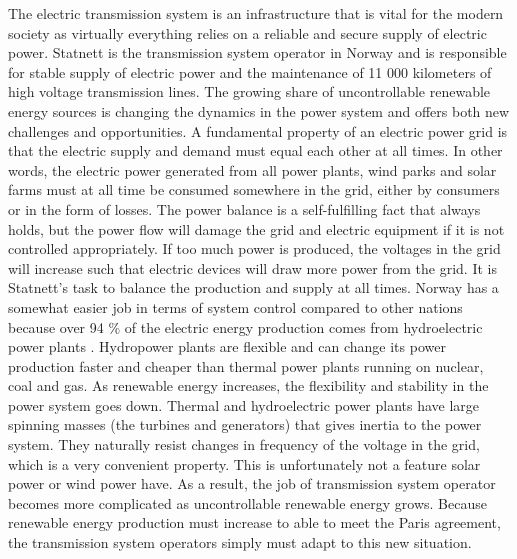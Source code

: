 \documentclass[class=book, crop=false]{standalone}
\begin{document}
The electric transmission system is an infrastructure that is vital for the modern society as virtually everything relies on a reliable and secure supply of electric power. Statnett is the transmission system operator in Norway and is responsible for stable supply of electric power and the  maintenance of 11 000 kilometers of high voltage transmission lines. The growing share of uncontrollable renewable energy sources is changing the dynamics in the power system and offers both new challenges and opportunities. A fundamental property of an electric power grid is that the electric supply and demand must equal each other at all times. In other words, the electric power generated from all power plants, wind parks and solar farms must at all time be consumed somewhere in the grid, either by consumers or in the form of losses. The power balance is a self-fulfilling fact that always holds, but the power flow will damage the grid and electric equipment if it is not controlled appropriately. If too much power is produced, the voltages in the grid will increase such that electric devices will draw more power from the grid. It is Statnett's task to balance the production and supply at all times. Norway has a somewhat easier job in terms of system control compared to other nations because over 94 \% of the electric energy production comes from hydroelectric power plants \cite{energifakta_norge}. Hydropower plants are flexible and can change its power production faster and cheaper than thermal power plants running on nuclear, coal and gas. As renewable energy increases, the flexibility and stability in the power system goes down. Thermal and hydroelectric power plants have large spinning masses (the turbines and generators) that gives inertia to the power system. They naturally resist changes in frequency of the voltage in the grid, which is a very convenient property. This is unfortunately not a feature solar power or wind power have. As a result, the job of transmission system operator becomes more complicated as uncontrollable renewable energy grows. Because renewable energy production must increase to able to meet the Paris agreement, the transmission system operators simply must adapt to this new situation.  
\end{document}
